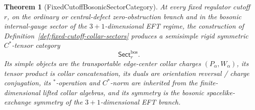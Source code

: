 \documentclass[11pt]{article}
\newtheorem{theorem}{Theorem}[section]
\begin{document}
\begin{theorem}[FixedCutoffBosonicSectorCategory]\label{thm:fixed-cutoff-bosonic-sector-category}
At every fixed regulator cutoff \(r\), on the ordinary or central-defect zero-obstruction branch
and in the bosonic internal-gauge sector of the \(3+1\)-dimensional EFT regime, the construction of
Definition~\ref{def:fixed-cutoff-collar-sectors} produces a semisimple rigid symmetric
\(C^*\)-tensor category
\[
\mathsf{Sect}^{\mathrm{bos}}_r.
\]
Its simple objects are the transportable edge-center collar charges \((P_\alpha,W_\alpha)\), its
tensor product is collar concatenation, its duals are orientation reversal / charge conjugation,
its \(^*\)-operation and \(C^*\)-norm are inherited from the finite-dimensional lifted collar
algebras, and its symmetry is the bosonic spacelike-exchange symmetry of the \(3+1\)-dimensional
EFT branch.
\end{theorem}
\end{document}
